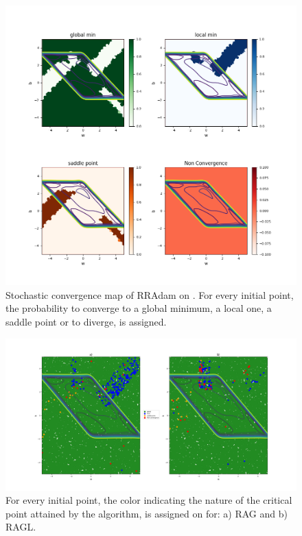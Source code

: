 \begin{figure}[h!]
	\centering
	\includegraphics[width=\textwidth]{chapitre5_img/RRAdam_polyFive.png}
	\caption{Stochastic convergence map of RRAdam on \polyFive. For every initial point, the probability to converge to a global minimum, a local one, a saddle point or to diverge, is assigned.}
	\label{RRAdam_polyFive}
\end{figure}

\begin{figure}[h!]
	\centering
	\includegraphics[width=\textwidth]{chapitre5_img/RAG_polyFive.png}
	\caption{For every initial point, the color indicating the nature of the critical point attained by the algorithm, is assigned on \polyFive for: a) RAG and b) RAGL.}
	\label{RAG_polyFive}
\end{figure}

